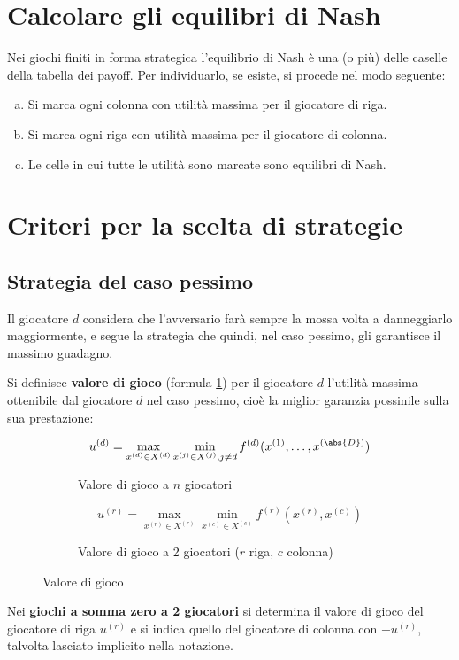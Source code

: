 \documentclass[\main/main.tex]{subfiles}
\begin{document}
\clearpage

\section{Calcolare gli equilibri di Nash}
Nei giochi finiti in forma strategica l'equilibrio di Nash è una (o più) delle caselle della tabella dei payoff. Per individuarlo, se esiste, si procede nel modo seguente:

\begin{enumerate}[a)]
	\item Si marca ogni colonna con utilità massima per il giocatore di riga.
	\item Si marca ogni riga con utilità massima per il giocatore di colonna.
	\item Le celle in cui tutte le utilità sono marcate sono equilibri di Nash.
\end{enumerate}

\section{Criteri per la scelta di strategie}
\subsection{Strategia del caso pessimo}
Il giocatore $d$ considera che l'avversario farà sempre la mossa volta a danneggiarlo maggiormente, e segue la strategia che quindi, nel caso pessimo, gli garantisce il massimo guadagno.

\begin{definition}
	Si definisce \textbf{valore di gioco} (formula \ref{valore_gioco}) per il giocatore $d$ l'utilità massima ottenibile dal giocatore $d$ nel caso pessimo, cioè la miglior garanzia possinile sulla sua prestazione:
	\begin{figure}
		\begin{subfigure}{0.49\textwidth}
			\[
			u^{(d)} = \max_{x^{(d)} \in X^{(d)}} \min_{x^{(j)} \in X^{(j)}, j\neq d} f^{(d)} (x^{(1)}, \ldots, x^{(\abs{D})})
			\]
			\caption{Valore di gioco a $n$ giocatori}
		\end{subfigure}
		\begin{subfigure}{0.49\textwidth}
			\[
			u^{(r)} = \max_{x^{(r)} \in X^{(r)}} \min_{x^{(c)} \in X^{(c)}} f^{(r)} (x^{(r)}, x^{(c)})
			\]
			\caption{Valore di gioco a 2 giocatori ($r$ riga, $c$ colonna)}
		\end{subfigure}
		\caption{Valore di gioco}
		\label{valore_gioco}
	\end{figure}

	Nei \textbf{giochi a somma zero a 2 giocatori} si determina il valore di gioco del giocatore di riga $u^{(r)}$ e si indica quello del giocatore di colonna con $-u^{(r)}$, talvolta lasciato implicito nella notazione.
\end{definition}
\end{document}
